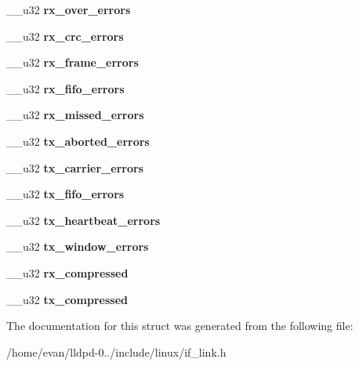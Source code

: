 \begin{DoxyCompactItemize}
\item 
\-\_\-\-\_\-u32 {\bfseries rx\-\_\-over\-\_\-errors}\label{structrtnl__link__stats_a40e539e399746862d798b6a29219d041}

\item 
\-\_\-\-\_\-u32 {\bfseries rx\-\_\-crc\-\_\-errors}\label{structrtnl__link__stats_ac067fed3a2945f549b221247a8dccdff}

\item 
\-\_\-\-\_\-u32 {\bfseries rx\-\_\-frame\-\_\-errors}\label{structrtnl__link__stats_a7d678a75b190c5bd28be92c14d563bbe}

\item 
\-\_\-\-\_\-u32 {\bfseries rx\-\_\-fifo\-\_\-errors}\label{structrtnl__link__stats_aeaa73fad0c5f16181d306673948f7ee4}

\item 
\-\_\-\-\_\-u32 {\bfseries rx\-\_\-missed\-\_\-errors}\label{structrtnl__link__stats_a037956d394e7bf22c81507c6c29149ae}

\item 
\-\_\-\-\_\-u32 {\bfseries tx\-\_\-aborted\-\_\-errors}\label{structrtnl__link__stats_ae41cafdeda19e3bbf3d7c769209d77a8}

\item 
\-\_\-\-\_\-u32 {\bfseries tx\-\_\-carrier\-\_\-errors}\label{structrtnl__link__stats_a9b4f7519577e0c867f1a23652ae34d25}

\item 
\-\_\-\-\_\-u32 {\bfseries tx\-\_\-fifo\-\_\-errors}\label{structrtnl__link__stats_a6c3e4a74c830ec00bafb8d85afdcab92}

\item 
\-\_\-\-\_\-u32 {\bfseries tx\-\_\-heartbeat\-\_\-errors}\label{structrtnl__link__stats_a7f82e75cbce92a96e9d506d7f458c3ed}

\item 
\-\_\-\-\_\-u32 {\bfseries tx\-\_\-window\-\_\-errors}\label{structrtnl__link__stats_a95c48c4430d443d554c512a5241b318f}

\item 
\-\_\-\-\_\-u32 {\bfseries rx\-\_\-compressed}\label{structrtnl__link__stats_a7737443bcbda54a5ff53e91a87f13777}

\item 
\-\_\-\-\_\-u32 {\bfseries tx\-\_\-compressed}\label{structrtnl__link__stats_a45a83c86538d7fc46c8094211d9b52dc}

\end{DoxyCompactItemize}


\-The documentation for this struct was generated from the following file\-:\begin{DoxyCompactItemize}
\item 
/home/evan/lldpd-\/0../include/linux/if\-\_\-link.\-h\end{DoxyCompactItemize}
